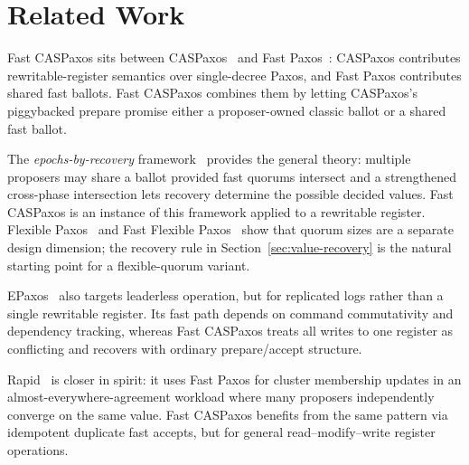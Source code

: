 \section{Related Work}
\label{sec:related-work}

Fast CASPaxos sits between CASPaxos~\cite{rystsov_caspaxos} and Fast Paxos~\cite{lamport_msr05}: CASPaxos contributes rewritable-register semantics over single-decree Paxos, and Fast Paxos contributes shared fast ballots.
Fast CASPaxos combines them by letting CASPaxos's piggybacked prepare promise either a proposer-owned classic ballot or a shared fast ballot.

The \emph{epochs-by-recovery} framework~\cite{howard_tr19,howard_arxiv19} provides the general theory: multiple proposers may share a ballot provided fast quorums intersect and a strengthened cross-phase intersection lets recovery determine the possible decided values.
Fast CASPaxos is an instance of this framework applied to a rewritable register.
Flexible Paxos~\cite{howard_opodis16} and Fast Flexible Paxos~\cite{howard_icdcn21} show that quorum sizes are a separate design dimension; the recovery rule in Section~\ref{sec:value-recovery} is the natural starting point for a flexible-quorum variant.

EPaxos~\cite{moraru_sosp13} also targets leaderless operation, but for replicated logs rather than a single rewritable register.
Its fast path depends on command commutativity and dependency tracking, whereas Fast CASPaxos treats all writes to one register as conflicting and recovers with ordinary prepare/accept structure.

Rapid~\cite{suresh_atc18} is closer in spirit: it uses Fast Paxos for cluster membership updates in an almost-everywhere-agreement workload where many proposers independently converge on the same value.
Fast CASPaxos benefits from the same pattern via idempotent duplicate fast accepts, but for general read--modify--write register operations.
